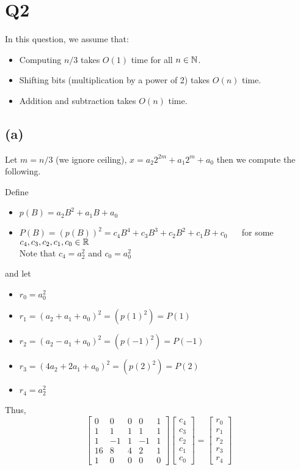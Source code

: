 \section*{Q2}

In this question, we assume that:
\begin{itemize}
    \item Computing $n/3$ takes $O(1)$ time for all $n \in \mathbb{N}$.
    \item Shifting bits (multiplication by a power of 2) takes $O(n)$ time.
    \item Addition and subtraction takes $O(n)$ time.
\end{itemize}

\subsection*{(a)}
Let $m = n/3$ (we ignore ceiling), $x = a_2 2^{2m} + a_1 2^m + a_0$
then we compute the following.

Define 

\begin{itemize}
    \item $p(B) = a_2 B^2 + a_1 B + a_0$
    \item $P(B) = (p(B))^2 = c_4 B^4 +  c_3 B^3 +  c_2 B^2 +  c_1 B +  c_0 $ $\quad$ for some $c_4, c_3, c_2, c_1, c_0 \in \mathbb{R}$\\
    Note that $c_4 = a_2^2$ and $c_0 = a_0^2$
\end{itemize}

and let

\begin{itemize}
    \item $r_0 = a_0^2$
    \item $r_1 = (a_2 + a_1 + a_0)^2 = (p(1)^2) = P(1)$
    \item $r_2 = (a_2 - a_1 + a_0)^2 = (p(-1)^2) = P(-1)$
    \item $r_3 = (4a_2 + 2a_1 + a_0)^2 = (p(2)^2) = P(2)$
    \item $r_4 = a_2^2$
\end{itemize}

Thus, 
\[\begin{bmatrix}
    0 & 0 & 0 & 0 & 1 \\
    1 & 1 & 1 & 1 & 1 \\
    1 & -1 & 1 & -1 & 1 \\
    16 & 8 & 4 & 2 & 1 \\
    1 & 0 & 0 & 0 & 0
\end{bmatrix}
\begin{bmatrix}
    c_4 \\
    c_3 \\
    c_2 \\
    c_1 \\
    c_0
\end{bmatrix}
= 
\begin{bmatrix}
    r_0 \\
    r_1 \\
    r_2 \\
    r_3 \\
    r_4
    \end{bmatrix}
\]

